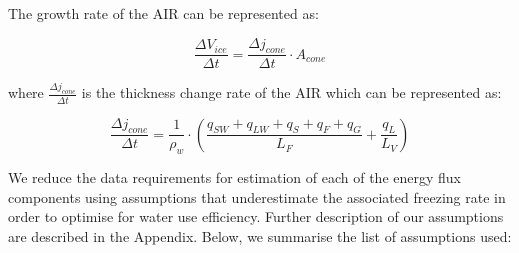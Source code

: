 \documentclass[utf8]{frontiersSCNS}
\begin{document}

The growth rate of the AIR can be represented as: 

\begin{equation}
  \frac{\Delta V_{ice}}{\Delta t}  =  \frac{\Delta j_{cone}}{ \Delta t} \cdot A_{cone}
	\label{eqn:freeze}
\end{equation}

where $\frac{\Delta j_{cone}}{\Delta t}$ is the thickness change rate of the AIR which can be represented as: 

\begin{equation}
  \frac{\Delta j_{cone}}{\Delta t}  = \frac{1}{\rho_w} \cdot (\frac{q_{SW} + q_{LW} + q_{S} + q_{F} + q_{G}}{L_F} + \frac{q_{L}}{L_V} )
	\label{eqn:freeze}
\end{equation}

We reduce the data requirements for estimation of each of the energy flux components using assumptions that
underestimate the associated freezing rate in order to optimise for water use efficiency. Further description of
our assumptions are described in the Appendix. Below, we summarise the list of assumptions used:
\end{document}
